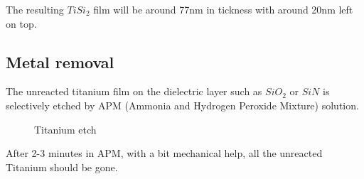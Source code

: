 The resulting $Ti Si_2$ film will be around 77nm in tickness with around 20nm left on top.


\subsection{Metal removal}

The unreacted titanium film on the dielectric layer such as $SiO_2$ or $SiN$ is selectively etched by APM (Ammonia and Hydrogen Peroxide Mixture) solution.

\begin{figure}[H]
	\centering
	\begin{tikzpicture}[node distance = 3cm, auto, thick,scale=\CrossSectionOnly, every node/.style={transform shape}]
		
	\end{tikzpicture}
	\drawStepArrow{}
	\begin{tikzpicture}[node distance = 3cm, auto, thick,scale=\CrossSectionOnly, every node/.style={transform shape}]
		
	\end{tikzpicture}
	\caption{Titanium etch}
\end{figure}

After 2-3 minutes in APM, with a bit mechanical help, all the unreacted Titanium should be gone.
